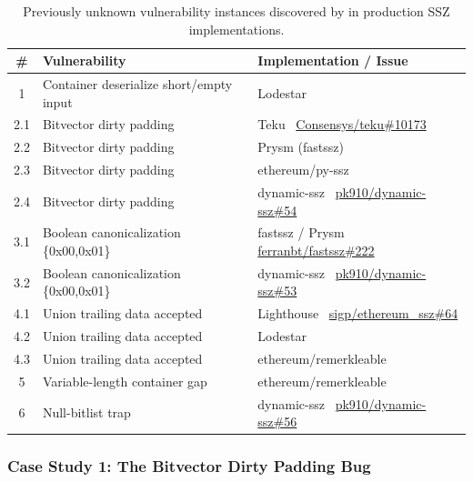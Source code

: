 \begin{table}[t]
\centering
\caption{Previously unknown vulnerability instances discovered by \tool in production SSZ implementations.}
\label{tab:0day-instances-report}
\small
\begin{tabular}{cll}
\toprule
\textbf{\#} & \textbf{Vulnerability} & \textbf{Implementation / Issue} \\
\midrule
1 & Container deserialize short/empty input & Lodestar~\cite{lodestar} \\
2.1 & Bitvector dirty padding & Teku~\cite{teku} \href{https://github.com/Consensys/teku/pull/10173}{Consensys/teku\#10173} \\
2.2 & Bitvector dirty padding & Prysm (fastssz)~\cite{prysm,fastssz} \\
2.3 & Bitvector dirty padding & ethereum/py-ssz~\cite{pyssz} \\
2.4 & Bitvector dirty padding & dynamic-ssz~\cite{dynamic_ssz} \href{https://github.com/pk910/dynamic-ssz/issues/54}{pk910/dynamic-ssz\#54} \\
3.1 & Boolean canonicalization \{0x00,0x01\} & fastssz / Prysm~\cite{fastssz,prysm} \href{https://github.com/ferranbt/fastssz/issues/222}{ferranbt/fastssz\#222} \\
3.2 & Boolean canonicalization \{0x00,0x01\} & dynamic-ssz~\cite{dynamic_ssz} \href{https://github.com/pk910/dynamic-ssz/issues/53}{pk910/dynamic-ssz\#53} \\
4.1 & Union trailing data accepted & Lighthouse~\cite{lighthouse} \href{https://github.com/sigp/ethereum_ssz/issues/64}{sigp/ethereum\_ssz\#64} \\
4.2 & Union trailing data accepted & Lodestar~\cite{lodestar} \\
4.3 & Union trailing data accepted & ethereum/remerkleable~\cite{remerkleable} \\
5 & Variable-length container gap & ethereum/remerkleable~\cite{remerkleable} \\
6 & Null-bitlist trap & dynamic-ssz~\cite{dynamic_ssz} \href{https://github.com/pk910/dynamic-ssz/issues/56}{pk910/dynamic-ssz\#56} \\
\bottomrule
\end{tabular}
\end{table}


\subsubsection{Case Study 1: The Bitvector Dirty Padding Bug}

